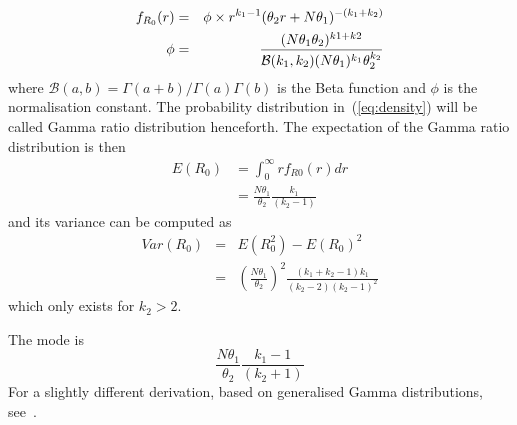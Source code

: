 \documentclass[11pt]{article}
\begin{document}
\begin{eqnarray}
\label{eq:density}
f_{R_0}(r) &=& \phi\times\space r^{k_1-1} (\theta_2 r + N\theta_1)^{-(k_1 + k_2)} \\
\label{eq:normconst}
\phi &=&  \frac{(N\theta_1\theta_2)^{k1+k2}}{\mathcal{B}(k_1, k_2)(N\theta_1)^{k_1}\theta_2^{k_2} }
\end{eqnarray}
where $\mathcal{B}(a, b) = \Gamma(a + b)/\Gamma(a)\Gamma(b)$ is the Beta function  and $\phi$ is the normalisation constant.
The probability distribution in~(\ref{eq:density}) will be called Gamma ratio distribution henceforth.
The expectation of the Gamma ratio distribution is then
\begin{align}
\label{eq:expR0}
E(R_0) &= \int_{0}^{\infty}rf_{R0}(r)dr \\
       &= \frac{N\theta_1}{\theta_2}\frac{k_1}{(k_2-1)}
\end{align}
and its variance can be computed as
\begin{eqnarray}
\label{eq:var1}
Var(R_0) &=& E(R_0^2) - E(R_0)^2  \\
\label{eq:var2}
 &=& \left(\frac{N\theta_1}{\theta_2}\right)^2\frac{(k_1+k_2-1)k_1}{(k_2-2)(k_2-1)^2}
\end{eqnarray}
which only exists for $k_2 > 2$.

The mode is 
\begin{equation}
\label{eq:mode}
\frac{N\theta_1}{\theta_2}\frac{k_1 - 1}{(k_2 + 1)}
\end{equation}
For a slightly different derivation, based on generalised Gamma distributions, see~\cite{Coelho2007}.
\end{document}

